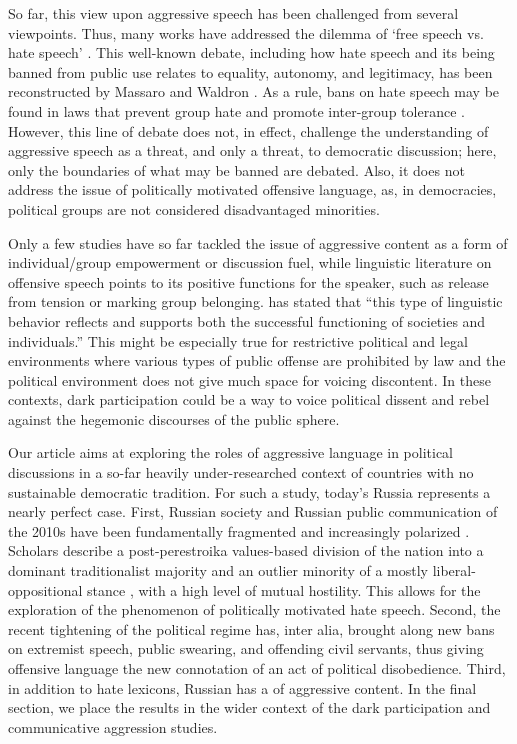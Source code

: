 So far, this view upon aggressive speech has been challenged from several viewpoints. Thus, many works have addressed the dilemma of ‘free speech vs. hate speech’ \cite{HareWeinstein,Howard,Weinstein}. This well-known debate, including how hate speech and its being banned from public use relates to equality, autonomy, and legitimacy, has been reconstructed by Massaro \cite{Massaro} and Waldron \cite{Waldron}. As a rule, bans on hate speech may be found in laws that prevent group hate and promote inter-group tolerance \cite[p.~8]{Waldron}. However, this line of debate does not, in effect, challenge the understanding of aggressive speech as a threat, and only a threat, to democratic discussion; here, only the boundaries of what may be banned are debated. Also, it does not address the issue of politically motivated offensive language, as, in democracies, political groups are not considered disadvantaged minorities.

Only a few studies have so far tackled the issue of aggressive content as a form of individual/group empowerment or discussion fuel, while linguistic literature on offensive speech points to its positive functions for the speaker, such as release from tension or marking group belonging. \cite[p.~61]{Burns} has stated that “this type of linguistic behavior reflects and supports both the successful functioning of societies and individuals.” This might be especially true for restrictive political and legal environments where various types of public offense are prohibited by law and the political environment does not give much space for voicing discontent. In these contexts, dark participation could be a way to voice political dissent and rebel against the hegemonic discourses of the public sphere.

Our article aims at exploring the roles of aggressive language in political discussions in a so-far heavily under-researched context of countries with no sustainable democratic tradition. For such a study, today’s Russia represents a nearly perfect case. First, Russian society and Russian public communication of the 2010s have been fundamentally fragmented and increasingly polarized \cite{BodrunovaLitvinenko2015}. Scholars describe a post-perestroika values-based division of the nation into a dominant traditionalist majority and an outlier minority of a mostly liberal-oppositional stance \cite{BerezuevZvonareva}, with a high level of mutual hostility. This allows for the exploration of the phenomenon of politically motivated hate speech. Second, the recent tightening of the political regime has, inter alia, brought along new bans on extremist speech, public swearing, and offending civil servants, thus giving offensive language the new connotation of an act of political disobedience. Third, in addition to hate lexicons, Russian has a of aggressive content. In the final section, we place the results in the wider context of the dark participation and communicative aggression studies.

